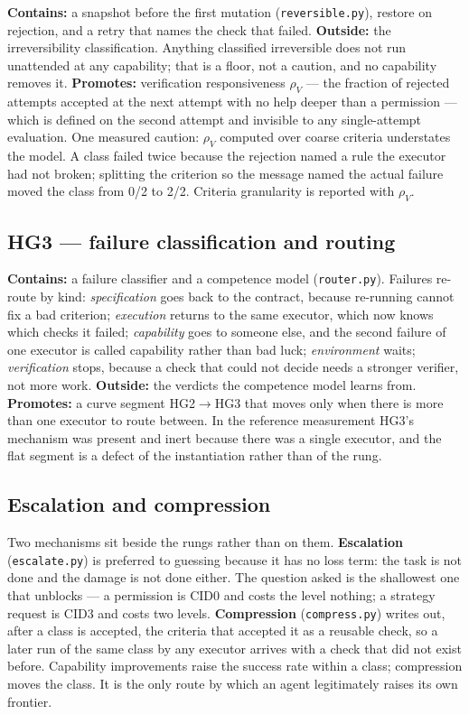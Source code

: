 \textbf{Contains:} a snapshot before the first mutation (\texttt{reversible.py}), restore on rejection, and a retry that names the check that failed. \textbf{Outside:} the irreversibility classification. Anything classified irreversible does not run unattended at any capability; that is a floor, not a caution, and no capability removes it. \textbf{Promotes:} verification responsiveness $\rho_V$ --- the fraction of rejected attempts accepted at the next attempt with no help deeper than a permission --- which is defined on the second attempt and invisible to any single-attempt evaluation. One measured caution: $\rho_V$ computed over coarse criteria understates the model. A class failed twice because the rejection named a rule the executor had not broken; splitting the criterion so the message named the actual failure moved the class from 0/2 to 2/2. Criteria granularity is reported with $\rho_V$.

\subsection{HG3 --- failure classification and routing}

\textbf{Contains:} a failure classifier and a competence model (\texttt{router.py}). Failures re-route by kind: \emph{specification} goes back to the contract, because re-running cannot fix a bad criterion; \emph{execution} returns to the same executor, which now knows which checks it failed; \emph{capability} goes to someone else, and the second failure of one executor is called capability rather than bad luck; \emph{environment} waits; \emph{verification} stops, because a check that could not decide needs a stronger verifier, not more work. \textbf{Outside:} the verdicts the competence model learns from. \textbf{Promotes:} a curve segment HG2$\to$HG3 that moves only when there is more than one executor to route between. In the reference measurement HG3's mechanism was present and inert because there was a single executor, and the flat segment is a defect of the instantiation rather than of the rung.

\subsection{Escalation and compression}

Two mechanisms sit beside the rungs rather than on them. \textbf{Escalation} (\texttt{escalate.py}) is preferred to guessing because it has no loss term: the task is not done and the damage is not done either. The question asked is the shallowest one that unblocks --- a permission is CID0 and costs the level nothing; a strategy request is CID3 and costs two levels. \textbf{Compression} (\texttt{compress.py}) writes out, after a class is accepted, the criteria that accepted it as a reusable check, so a later run of the same class by any executor arrives with a check that did not exist before. Capability improvements raise the success rate within a class; compression moves the class. It is the only route by which an agent legitimately raises its own frontier.

